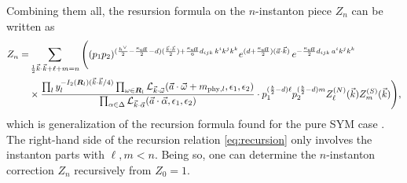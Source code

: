 \documentclass[letterpaper, 11pt]{article}
\newcommand{\nn}{\nonumber}
\def\CL{{\cal L}}
\def\a{\alpha}
\def\e{\epsilon}
\def\k{\kappa}
\def\w{\omega}
\def\D{\Delta}
\begin{document}
Combining them all, the resursion formula on the $n$-instanton piece $Z_n$ can be written as
\begin{align}
  \label{eq:recursion}
  Z_n = &\sum_{\frac{1}{2}\vec{k}\cdot\vec{k} + \ell + m = n}  
  \Bigg( (p_1p_2)^{(\frac{h^\vee}{2} - \frac{\kappa_\text{eff}}{2}-d) (\frac{\vec{k}\cdot\vec{k}}{2}) +\frac{\k_\text{eff}}{6}d_{ijk}\,k^ik^jk^k} e^{(d+\frac{\k_\text{eff}}{2})(\vec{a}\cdot\vec{k})}\,
 e^{-\frac{\k_\text{eff}}{2}d_{ijk}\,a^ik^jk^k} \\& 
 \times    \frac{\prod_{l} y_l^{-I_2(\boldsymbol{R}_l)(\vec{k}\cdot\vec{k}/4)} \prod_{\w \in \boldsymbol{R}_l} \CL_{\vec{k}\cdot\vec{\w}}(\vec{a}\cdot \vec{\w} + m_{\text{phy},l}, \e_1,\e_2)}{ \prod_{\a \in \D} \CL_{\vec{k} \cdot \vec{\a}} (\vec{a}\cdot\vec{\alpha}, \epsilon_1, \epsilon_2)}
 \cdot p_1^{(\frac{b}{2}-d)\ell}p_2^{(\frac{b}{2}-d)m}Z^{(N)}_{\ell}(\vec{k})  Z^{(S)}_m (\vec{k}) \Bigg) \nn,
 \end{align}
 which is generalization of the recursion formula found for the pure SYM case \cite{Nakajima:2005fg,Gottsche:2006bm}. 
 The right-hand side of the recursion relation \eqref{eq:recursion} only involves the instanton parts with $\ell , m < n$. Being so, one can determine the $n$-instanton correction $Z_n$ recursively from $Z_0 = 1$. 
\end{document}
